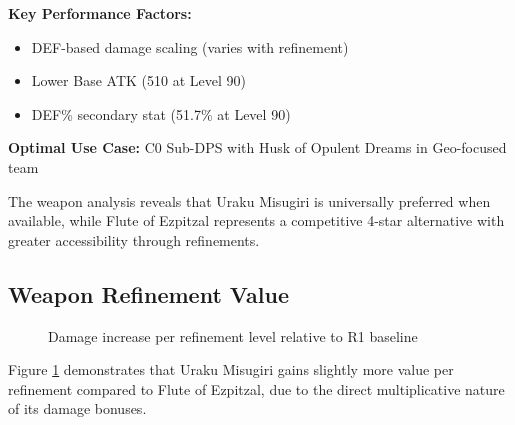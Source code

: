 \documentclass[12pt,a4paper]{article}
\begin{document}
\begin{tcolorbox}[colback=geoyellow!5, colframe=geoyellow, title=Flute of Ezpitzal (R5)]
\textbf{Key Performance Factors:}
\begin{itemize}
    \item DEF-based damage scaling (varies with refinement)
    \item Lower Base ATK (510 at Level 90)
    \item DEF\% secondary stat (51.7\% at Level 90)
\end{itemize}

\textbf{Optimal Use Case:} C0 Sub-DPS with Husk of Opulent Dreams in Geo-focused team
\end{tcolorbox}

The weapon analysis reveals that Uraku Misugiri is universally preferred when available, while Flute of Ezpitzal represents a competitive 4-star alternative with greater accessibility through refinements.

\subsection{Weapon Refinement Value}

\begin{figure}[H]
\centering
{}
\caption{Damage increase per refinement level relative to R1 baseline}
\label{fig:refinement_value}
\end{figure}

Figure \ref{fig:refinement_value} demonstrates that Uraku Misugiri gains slightly more value per refinement compared to Flute of Ezpitzal, due to the direct multiplicative nature of its damage bonuses.
\end{document}
